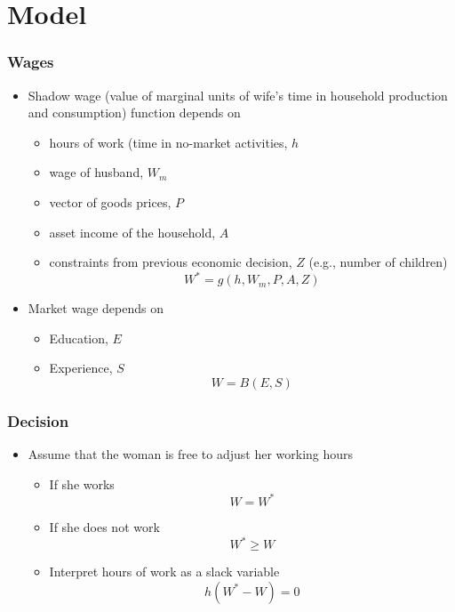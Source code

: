 \section{Model}

\begin{frame}
	\frametitle{Wages}
		\begin{itemize}
			\item Shadow wage (value of marginal units of wife's time in household production and consumption) function depends on
				\begin{itemize}
					\item hours of work (time in no-market activities, $h$
					\item wage of husband, $W_{m}$
					\item vector of goods prices, $P$
					\item asset income of the household, $A$
					\item constraints from previous economic decision, $Z$ (e.g., number of children)
					\begin{equation}
						W^* = g \left( h, W_{m}, P, A, Z \right)
					\end{equation}
				\end{itemize}
			\item Market wage depends on
				\begin{itemize}
					\item Education, $E$
					\item Experience, $S$
						\begin{equation}
							W = B (E,S)
						\end{equation}
				\end{itemize}
		\end{itemize}
\end{frame}

\begin{frame}
	\frametitle{Decision}
		\begin{itemize}
			\item Assume that the woman is free to adjust her working hours
			\begin{itemize}
				\item If she works
					\begin{equation}
						W = W^*
					\end{equation}
				\item If she does not work
					\begin{equation}
						W^* \geq W
					\end{equation}
			\item Interpret hours of work as a slack variable
				\begin{equation}
					h \left( W^* - W \right) = 0
 				\end{equation}
			\end{itemize}
		\end{itemize}
\end{frame}	


